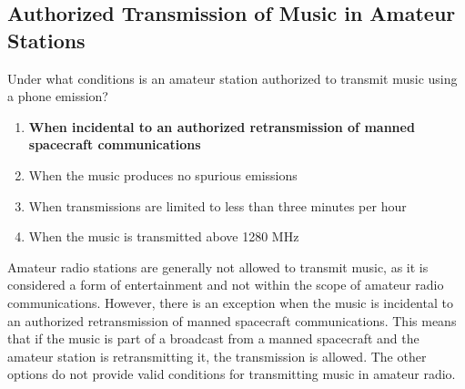 \subsection{Authorized Transmission of Music in Amateur Stations}\label{T1D04}

\begin{tcolorbox}[colback=gray!10!white,colframe=black!75!black,title=T1D04]
Under what conditions is an amateur station authorized to transmit music using a phone emission?
\begin{enumerate}[label=\Alph*),noitemsep]
    \item \textbf{When incidental to an authorized retransmission of manned spacecraft communications}
    \item When the music produces no spurious emissions
    \item When transmissions are limited to less than three minutes per hour
    \item When the music is transmitted above 1280 MHz
\end{enumerate}
\end{tcolorbox}

Amateur radio stations are generally not allowed to transmit music, as it is considered a form of entertainment and not within the scope of amateur radio communications. However, there is an exception when the music is incidental to an authorized retransmission of manned spacecraft communications. This means that if the music is part of a broadcast from a manned spacecraft and the amateur station is retransmitting it, the transmission is allowed. The other options do not provide valid conditions for transmitting music in amateur radio.